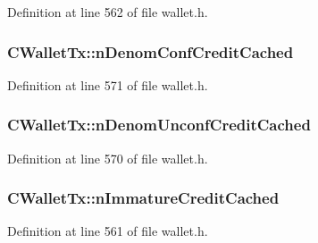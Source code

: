 Definition at line 562 of file wallet.\+h.

\hypertarget{class_c_wallet_tx_a2fcf31679a29b43c3a01dd44bf844aee}{}
\subsubsection[{n\+Denom\+Conf\+Credit\+Cached}]{ C\+Wallet\+Tx\+::n\+Denom\+Conf\+Credit\+Cached\hspace{0.3cm}{\ttfamily [mutable]}}\label{class_c_wallet_tx_a2fcf31679a29b43c3a01dd44bf844aee}


Definition at line 571 of file wallet.\+h.

\hypertarget{class_c_wallet_tx_a1ecccbf8322abc397686907c0cbcefba}{}
\subsubsection[{n\+Denom\+Unconf\+Credit\+Cached}]{ C\+Wallet\+Tx\+::n\+Denom\+Unconf\+Credit\+Cached\hspace{0.3cm}{\ttfamily [mutable]}}\label{class_c_wallet_tx_a1ecccbf8322abc397686907c0cbcefba}


Definition at line 570 of file wallet.\+h.

\hypertarget{class_c_wallet_tx_a6b9278766d4c82554b8b4976bff3ef2c}{}
\subsubsection[{n\+Immature\+Credit\+Cached}]{ C\+Wallet\+Tx\+::n\+Immature\+Credit\+Cached\hspace{0.3cm}{\ttfamily [mutable]}}\label{class_c_wallet_tx_a6b9278766d4c82554b8b4976bff3ef2c}


Definition at line 561 of file wallet.\+h.

